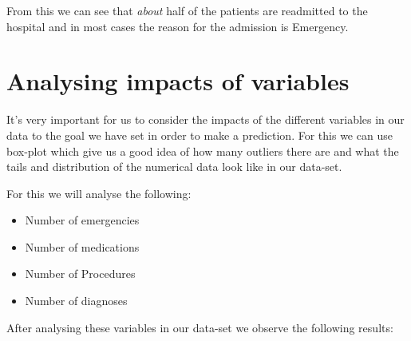 \documentclass[11pt]{report}
\newcommand{\linespace}{\vspace{0.3cm}\noindent}
\begin{document}
\noindent
From this we can see that \textit{about} half of the patients are readmitted to the hospital and in most cases the reason for the admission is Emergency.

\newpage
\section{Analysing impacts of variables}

\noindent
It's very important for us to consider the impacts of the different variables in our data to the goal we have set in order to make a prediction. For this we can use box-plot which give us a good idea of how many outliers there are and what the tails and distribution of the numerical data look like in our data-set.

\linespace
For this we will analyse the following:

\begin{itemize}
	\itemsep0em 
	\item Number of emergencies
	\item Number of medications
	\item Number of Procedures
	\item Number of diagnoses
\end{itemize}

After analysing these variables in our data-set we observe the following results:
\end{document}
